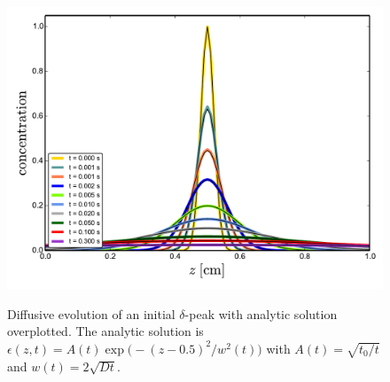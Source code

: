 \documentclass[11pt]{article}
\begin{document}
\begin{figure}
\centering
\vspace*{-5mm}
\includegraphics[width=16cm]{test4.pdf}\\[-5mm]
\caption{Diffusive evolution of an initial $\delta$-peak with
  analytic solution overplotted. The analytic solution is
  $\epsilon(z,t)=A(t)\exp\big(-(z\!-\!0.5)^2/w^2(t)\big)$ with
  $A(t)=\sqrt{t_0/t}$ and $w(t)=2\sqrt{D t}$.}
\label{fig4}
\end{figure}



\end{document}
